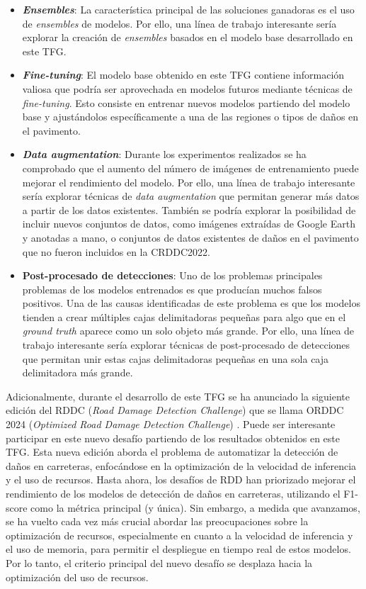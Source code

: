 \begin{itemize}
    \item \textbf{\textit{Ensembles}}: La característica principal de las soluciones ganadoras es el uso de \textit{ensembles} de modelos. Por ello, una línea de trabajo interesante sería explorar la creación de \textit{ensembles} basados en el modelo base desarrollado en este TFG.
    \item \textbf{\textit{Fine-tuning}}: El modelo base obtenido en este TFG contiene información valiosa que podría ser aprovechada en modelos futuros mediante técnicas de \textit{fine-tuning}. Esto consiste en entrenar nuevos modelos partiendo del modelo base y ajustándolos específicamente a una de las regiones o tipos de daños en el pavimento.
    \item \textbf{\textit{Data augmentation}}: Durante los experimentos realizados se ha comprobado que el aumento del número de imágenes de entrenamiento puede mejorar el rendimiento del modelo. Por ello, una línea de trabajo interesante sería explorar técnicas de \textit{data augmentation} que permitan generar más datos a partir de los datos existentes. También se podría explorar la posibilidad de incluir nuevos conjuntos de datos, como imágenes extraídas de Google Earth y anotadas a mano, o conjuntos de datos existentes de daños en el pavimento que no fueron incluidos en la CRDDC2022.
    \item \textbf{Post-procesado de detecciones}: Uno de los problemas principales problemas de los modelos entrenados es que producían muchos falsos positivos. Una de las causas identificadas de este problema es que los modelos tienden a crear múltiples cajas delimitadoras pequeñas para algo que en el \textit{ground truth} aparece como un solo objeto más grande. Por ello, una línea de trabajo interesante sería explorar técnicas de post-procesado de detecciones que permitan unir estas cajas delimitadoras pequeñas en una sola caja delimitadora más grande.
\end{itemize}

Adicionalmente, durante el desarrollo de este TFG se ha anunciado la siguiente edición del RDDC (\textit{Road Damage Detection Challenge}) que se llama ORDDC 2024 (\textit{Optimized Road Damage Detection Challenge}) \cite{ORDDC2024}. Puede ser interesante participar en este nuevo desafío partiendo de los resultados obtenidos en este TFG. Esta nueva edición aborda el problema de automatizar la detección de daños en carreteras, enfocándose en la optimización de la velocidad de inferencia y el uso de recursos. Hasta ahora, los desafíos de RDD han priorizado mejorar el rendimiento de los modelos de detección de daños en carreteras, utilizando el F1-score como la métrica principal (y única). Sin embargo, a medida que avanzamos, se ha vuelto cada vez más crucial abordar las preocupaciones sobre la optimización de recursos, especialmente en cuanto a la velocidad de inferencia y el uso de memoria, para permitir el despliegue en tiempo real de estos modelos. Por lo tanto, el criterio principal del nuevo desafío se desplaza hacia la optimización del uso de recursos.

